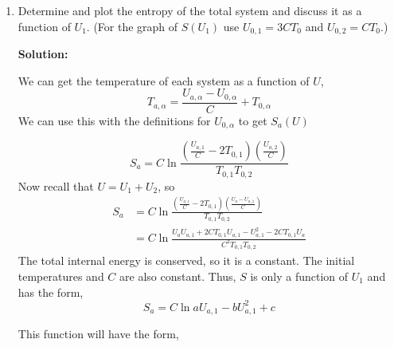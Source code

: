 \documentclass[10pt]{article}
\newenvironment{Solution}
    {\textbf{Solution:}
    
    \vspace{5mm}
    \begin{tcolorbox}
    }
    {
    \end{tcolorbox}
    \vspace{5mm}
    }
\begin{document}
\begin{enumerate}
\begin{enumerate}
\begin{Solution}
\begin{equation}
    \boxed{
    U_{a} = C \left(T_{a,1}-T_{0,1}\right)+U_{0,1} + C \left(T_{a,2}-T_{0,2}\right)+U_{0,2}
    }
\end{equation}
\begin{equation}
\boxed{
    S_a = C \ln{\frac{T_{a,1}}{T_{0,1}}} + C \ln{\frac{T_{a,2}}{T_{0,2}}}
    } = \boxed{
    C \ln{\frac{T_{a,1}T_{a,2}}{T_{0,1}T_{0,2}}}}
\end{equation}
\end{Solution}
\newpage

\item Determine and plot the entropy of the total system and discuss it as a function of $U_{1}$. (For the graph of $S\left(U_{1}\right)$ use $U_{0, 1}=3 C T_{0}$ and $U_{0, 2}=C T_{0}$.)

\begin{Solution}

We can get the temperature of each system as a function of $U$,
\begin{equation}
    T_{a,\alpha} = \frac{U_{a,\alpha} - U_{0,\alpha}}{C}+T_{0,\alpha}
\end{equation}
We can use this with the definitions for $U_{0,\alpha}$ to get $S_a(U)$

\begin{equation}
    S_a =  C \ln{\frac{\left(\frac{U_{a,1}}{C} - 2 T_{0,1} \right) \left(\frac{U_{a,2}}{C}\right)}{T_{0,1}T_{0,2}}} 
\end{equation}
Now recall that $U = U_1 + U_2$,  so 
\begin{align}
    S_a &=  C \ln{\frac{\left(\frac{U_{a,1}}{C} - 2 T_{0,1} \right) \left(\frac{U_a - U_{a,1} }{C}\right)}{T_{0,1}T_{0,2}}}\\
    &\boxed{= C \ln{\frac{U_{a}U_{a,1} + 2CT_{0,1}U_{a,1} - U_{a,1}^2 - 2CT_{0,1}U_{a}}{C^2 T_{0,1}T_{0,2}}}}
\end{align}
The total internal energy is conserved, so it is a constant. The initial temperatures and $C$ are also constant. Thus, $S$ is only a function of $U_1$ and has the form,
\begin{equation}
    S_a = C \ln{a U_{a,1} - b U_{a,1}^2 + c}
\end{equation}

This function will have the form, 


\end{Solution}
\end{enumerate}
\end{enumerate}
\end{document}
